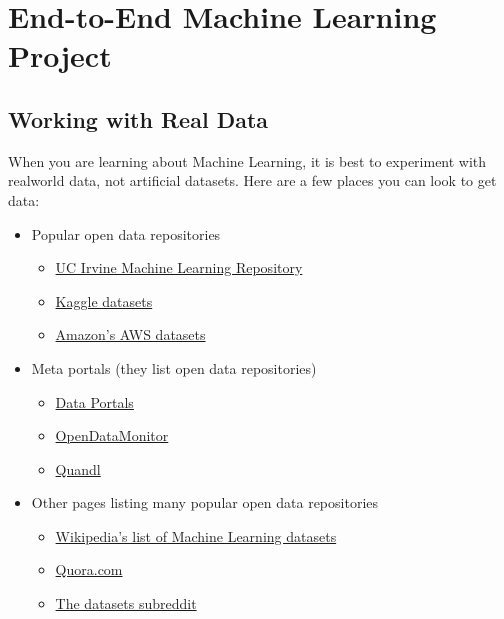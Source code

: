 \chapter{End-to-End Machine Learning Project\label{End-to-End Machine Learning Project}}
\section{Working with Real Data\label{Working with Real Data}}

When you are learning about Machine Learning, it is best to experiment with realworld data, not artificial datasets. Here are a few places you can look
to get data:
\begin{itemize}
\item Popular open data repositories
\begin{itemize}
\item \href{http://archive.ics.uci.edu/ml/index.php}{UC Irvine Machine Learning Repository}

\item \href{https://www.kaggle.com/datasets}{Kaggle datasets}

\item \href{https://registry.opendata.aws/}{Amazon's AWS datasets}
\end{itemize}

\item Meta portals (they list open data repositories)
\begin{itemize}
\item \href{http://dataportals.org/}{Data Portals}

\item \href{http://opendatamonitor.eu/}{OpenDataMonitor}

\item \href{https://data.nasdaq.com/}{Quandl}
\end{itemize}

\item Other pages listing many popular open data repositories
\begin{itemize}
\item \href{https://en.wikipedia.org/wiki/List_of_datasets_for_machine-learning_research}{Wikipedia's list of Machine Learning datasets}

\item\href{https://www.quora.com/Where-can-I-find-large-datasets-open-to-the-public}{Quora.com}

\item\href{https://www.reddit.com/r/datasets/}{The datasets subreddit}
\end{itemize}
\end{itemize}

